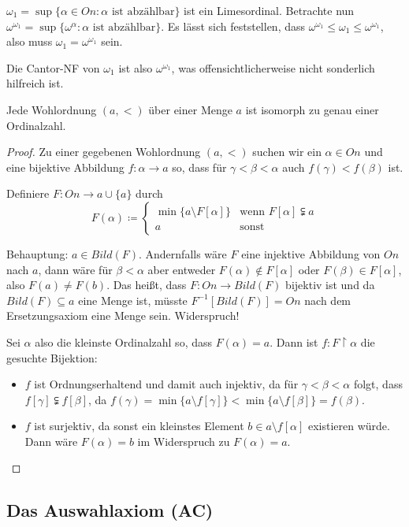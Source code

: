 $\omega_1=\sup\{\alpha\in On : \alpha \text{ ist abzählbar}\}$ ist ein Limesordinal. Betrachte nun $\omega^{\omega_1}=\sup\{\omega^\alpha : \alpha \text{ ist abzählbar}\}$. Es lässt sich feststellen, dass $\omega^{\omega_1}\leq\omega_1\leq\omega^{\omega_1}$, also muss $\omega_1=\omega^{\omega_1}$ sein.

Die Cantor-NF von $\omega_1$ ist also $\omega^{\omega_1}$, was offensichtlicherweise nicht sonderlich hilfreich ist.

\begin{satz}
	Jede Wohlordnung $(a,<)$ über einer Menge $a$ ist isomorph zu genau einer Ordinalzahl.
\end{satz}
\begin{proof}
	Zu einer gegebenen Wohlordnung $(a,<)$ suchen wir ein $\alpha\in On$ und eine bijektive Abbildung $f:\alpha\to a$ so, dass für $\gamma<\beta<\alpha$ auch $f(\gamma)<f(\beta)$ ist.
	
	Definiere $F:On\to a\cup\{a\}$ durch
	$$
	F(\alpha)\coloneqq\begin{cases}
		\min\{a\setminus F[\alpha]\} & \text{wenn } F[\alpha]\subsetneqq a\\
		a & \text{sonst}
	\end{cases}
	$$
	
	Behauptung: $a\in Bild(F)$. Andernfalls wäre $F$ eine injektive Abbildung von $On$ nach $a$, dann wäre für $\beta<\alpha$ aber entweder $F(\alpha)\notin F[\alpha]$ oder $F(\beta)\in F[\alpha]$, also $F(a)\neq F(b)$. Das heißt, dass $F:On\to Bild(F)$ bijektiv ist und da $Bild(F)\subseteq a$ eine Menge ist, müsste $F^{-1}[Bild(F)]=On$ nach dem Ersetzungsaxiom eine Menge sein. Widerspruch!
	
	Sei $\alpha$ also die kleinste Ordinalzahl so, dass $F(\alpha)=a$. Dann ist $f:F\upharpoonright \alpha$ die gesuchte Bijektion:
	\begin{itemize}
		\item $f$ ist Ordnungserhaltend und damit auch injektiv, da für $\gamma<\beta<\alpha$ folgt, dass $f[\gamma]\subsetneqq f[\beta]$, da $f(\gamma)=\min\{a\setminus f[\gamma]\}<\min\{a\setminus f[\beta]\}=f(\beta)$.
		\item $f$ ist surjektiv, da sonst ein kleinstes Element $b\in a\setminus f[\alpha]$ existieren würde. Dann wäre $F(\alpha)=b$ im Widerspruch zu $F(\alpha)=a$.
	\end{itemize}
\end{proof}

\subsection{Das Auswahlaxiom (AC)}

